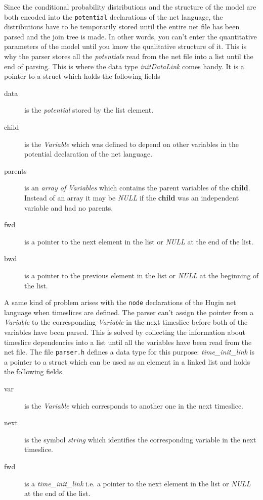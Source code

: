 \documentclass[12pt,a4paper]{report}
\begin{document}
Since the conditional probability distributions and the structure of
the model are both encoded into the \verb+potential+ declarations of
the net language, the distributions have to be temporarily stored until
the entire net file has been parsed and the join tree is made. In
other words, you can't enter the quantitative parameters of the model
until you know the qualitative structure of it. This is why the parser
stores all the {\it potentials} read from the net file into a list
until the end of parsing. This is where the data type 
{\it initDataLink} comes handy. It is a pointer to a struct which
holds the following fields
\begin{description}
\item[data] is the {\it potential} stored by the list element.
\item[child] is the {\it Variable} which was defined to depend on
other variables in the potential declaration of the net language.
\item[parents] is an {\it array of Variables} which contains the
parent variables of the \textbf{child}. Instead of an array it may be
{\it NULL} if the \textbf{child} was an independent variable and had
no parents.
\item[fwd] is a pointer to the next element in the list or {\it NULL}
at the end of the list.
\item[bwd] is a pointer to the previous element in the list or {\it NULL}
at the beginning of the list.
\end{description}

A same kind of problem arises with the \verb+node+ declarations of the
Hugin net language when timeslices are defined. The parser can't assign
the pointer from a {\it Variable} to the corresponding {\it Variable}
in the next timeslice before both of the variables have been
parsed. This is solved by collecting the information about timeslice 
dependencies into a list until all the variables have been read from
the net file. The file \verb+parser.h+ defines a data type for this
purpose: {\it time\_init\_link} is a pointer to a struct which can be
used as an element in a linked list and holds the following fields
\begin{description}\item[var] is the {\it Variable} which corresponds
to another one in the next timeslice.
\item[next] is the symbol {\it string} which identifies the corresponding 
variable in the next timeslice.
\item[fwd] is a {\it time\_init\_link} i.e. a pointer to the next
element in the list or {\it NULL} at the end of the list.
\end{description}
\end{document}
